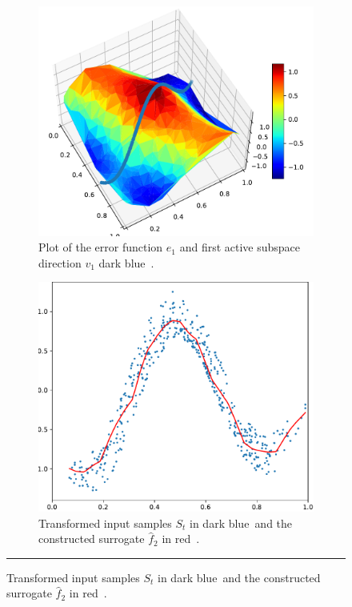 \documentclass[
  a4paper,  %
  twoside,  %
  bibliography=totoc,
  headsepline,
  cleardoublepage=empty,
  parskip=half,
  draft=false
]{scrbook}
\newcommand{\Hsquare}{%
  \text{\fboxsep=-.2pt\fbox{\rule{0pt}{1.4ex}\rule{1.4ex}{0pt}}}%
}
\newcommand\red{red\,{\setlength\fboxsep{0pt}\colorbox{persian_red}{\Hsquare}} }
\newcommand\darkblue{dark blue\,{\setlength\fboxsep{0pt}\colorbox{charcoal}{\Hsquare}} }
\newcommand{\delimit}{{\color{charcoal}\noindent\rule{\textwidth}{1pt}}}
\begin{document}
\begin{mdframed}[style=style]
\begin{figure}[H]
\begin{subfigure}{.5\textwidth}
  \centering
  \includegraphics[width=.8\linewidth]{graphics/pipeline_current_2}
  \caption{Plot of the error function $e_1$ and first active subspace direction $v_1$ \darkblue.}
\label{fig:pipeline_current_2}
\end{subfigure}%
\begin{subfigure}{.5\textwidth}
  \centering
  \includegraphics[width=.8\linewidth]{graphics/pipeline_local_2}
  \caption{Transformed input samples $S_t$ in \darkblue and the constructed surrogate $\hat{f}_2$ in \red.}
\label{fig:pipeline_local_2}
\end{subfigure}
\delimit
{}
\label{fig:pipeline_2}
\end{figure}
\end{mdframed}
\end{document}
